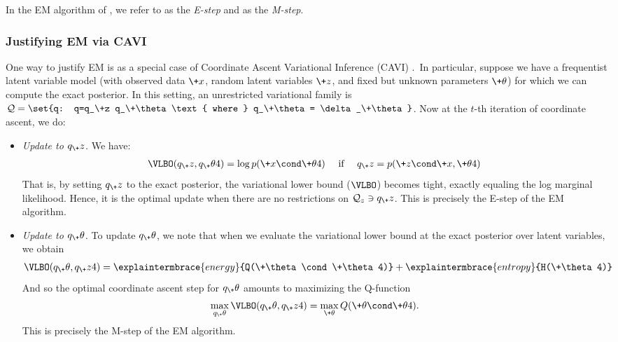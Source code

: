 \documentclass{article} %
\newcommand{\param}{\+\theta}
\begin{document}
In the EM algorithm of 
, we refer to  as the \textit{E-step} and  as the \textit{M-step}.

\subsubsection{Justifying EM via CAVI}

  One way to justify EM is as a special case of Coordinate Ascent Variational Inference (CAVI) \cite{wojnowiczXXXXvariational}.\footnotemark~In particular, suppose we have a frequentist latent variable model (with observed data $\+x$, random latent variables $\+z$, and fixed but unknown parameters $\param$) for which we can compute the exact posterior.  In this setting, an unrestricted variational family is $\mathcal{Q} = \set{q: q=q_\+z q_\param \text{ where } q_\param = \delta_\param}$.  Now at the $t$-th iteration of coordinate ascent, we do:


\begin{itemize}
\item \textit{Update to $q_\+z$.} We have:
%
\begin{align}
\VLBO(q_\+z, q_\param^^t) = \log p(\+x \cond \param^^t) \quad \text{ if } \quad 	q_\+z=p(\+z \cond \+x, \param^^t)
\end{align}
%
That is, by setting $q_\+z$ to the exact posterior, the variational lower bound ($\VLBO$) becomes tight, exactly equaling the log marginal likelihood. Hence, it is the optimal update when there are no restrictions on $\mathcal{Q}_z \ni q_\+z$.  This is precisely the E-step of the EM algorithm.

\item \textit{Update to $q_\param$.}	 To update $q_\param$, we note that when we evaluate the variational lower bound at the exact posterior over latent variables, we obtain
%
\begin{align}
\VLBO(q_\param, q_\+z^^t) = \explaintermbrace{energy}{Q(\param \cond \param^^t)} + \explaintermbrace{entropy}{H(\param^^t)}
\end{align}
%
And so the optimal coordinate ascent step for $q_\param$ amounts to maximizing the Q-function
%
\begin{align}
\max_{q_\param} \VLBO(q_\param, q_\+z^^t) = \max_{\param}  Q(\param \cond \param^^t). 
\end{align}
%
This is precisely the M-step of the EM algorithm.
\end{itemize}
%
\end{document}
